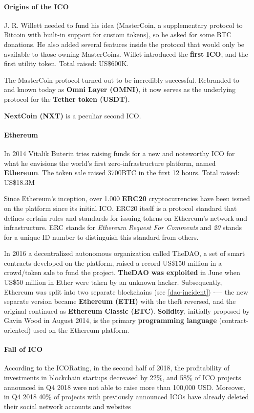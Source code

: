 \paragraph{Origins of the ICO} J. R. Willett needed to fund his idea (MasterCoin, a supplementary protocol to Bitcoin with built-in support for custom tokens), so he asked for some BTC donations. He also added several features inside the protocol that would only be available to those owning MasterCoins.
Willet introduced the \textbf{first ICO}, and the first utility token.
Total raised: US\$600K.

The MasterCoin protocol turned out to be incredibly successful. Rebranded to and known today as \textbf{Omni Layer (OMNI)}, it now serves as the underlying protocol for the \textbf{Tether token (USDT)}.

\textbf{NextCoin (NXT)} is a peculiar second ICO.

\paragraph{Ethereum}
In 2014 Vitalik Buterin tries raising funds for a new and noteworthy ICO for what he envisions the world's first zero-infrastructure platform, named \textbf{Ethereum}.
The token sale raised 3700BTC in the first 12 hours.
Total raised: US\$18.3M

Since Ethereum's inception, over 1.000 \textbf{ERC20} cryptocurrencies have been issued on the platform since its initial ICO. ERC20 itself is a protocol standard that defines certain rules and standards for issuing tokens on Ethereum's network and infrastructure. ERC stands for \emph{Ethereum Request For Comments} and \emph{20} stands for a unique ID number to distinguish this standard from others.

In 2016 a decentralized autonomous organization called TheDAO, a set of smart contracts developed on the platform, raised a record US\$150 million in a crowd/token sale to fund the project. \textbf{TheDAO was exploited} in June when US\$50 million in Ether were taken by an unknown hacker. Subsequently, Ethereum was split into two separate blockchains (see \ref{dao-incident}) -— the new separate version became \textbf{Ethereum (ETH)} with the theft reversed, and the original continued as \textbf{Ethereum Classic (ETC)}.
\textbf{Solidity}, initially proposed by Gavin Wood in August 2014, is the primary \textbf{programming language} (contract-oriented) used on the Ethereum platform.

\paragraph{Fall of ICO}
According to the ICORating, in the second half of 2018, the profitability of investments in blockchain startups decreased by 22\%, and 58\% of ICO projects announced in Q4 2018 were not able to raise more than 100,000 USD. Moreover, in Q4 2018 40\% of projects with previously announced ICOs have already deleted their social network accounts and websites


